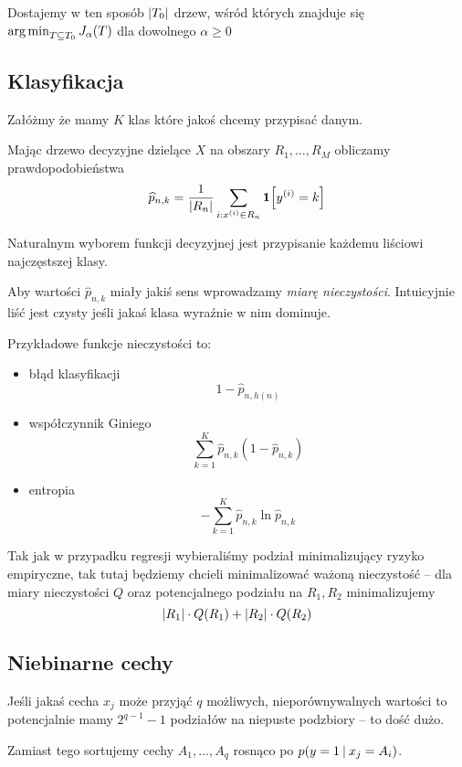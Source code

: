 Dostajemy w ten sposób \( \card{T_0} \) drzew, wśród których znajduje się \( \operatorname*{arg\,min}_{T \subseteq T_0}  J_\alpha(T) \) dla dowolnego \( \alpha \geq 0 \)


\subsection{Klasyfikacja}

Załóżmy że mamy \( K \) klas które jakoś chcemy przypisać danym.

Mając drzewo decyzyjne dzielące \( X \) na obszary \( R_1, \dots, R_M \)
obliczamy prawdopodobieństwa
\[
	\widehat p_{n, k} = \frac{1}{\card{R_n}} \sum_{i : x^{(i)} \in R_n} \indicator{y^{(i)} = k}
\]

Naturalnym wyborem funkcji decyzyjnej jest przypisanie każdemu liściowi najczęstszej klasy.

Aby wartości \( \widehat p_{n, k} \) miały jakiś sens wprowadzamy \textit{miarę nieczystości}.
Intuicyjnie liść jest czysty jeśli jakaś klasa wyraźnie w nim dominuje.

Przykładowe funkcje nieczystości to:
\begin{itemize}
	\item błąd klasyfikacji
	      \[
		      1 - \widehat p_{n, h(n)}
	      \]
	\item współczynnik Giniego
	      \[
		      \sum_{k=1}^K \widehat p_{n, k}(1 - \widehat p_{n, k})
	      \]
	\item entropia
	      \[
		      -\sum_{k=1}^K \widehat p_{n, k} \ln \widehat p_{n, k}
	      \]
\end{itemize}

Tak jak w przypadku regresji wybieraliśmy podział minimalizujący ryzyko empiryczne, tak tutaj będziemy chcieli minimalizować ważoną nieczystość -- dla miary nieczystości \( Q \) oraz potencjalnego podziału na \( R_1, R_2 \) minimalizujemy
\[
	\card{R_1} \cdot Q(R_1) + \card{R_2} \cdot Q(R_2)
\]

\subsection{Niebinarne cechy}

Jeśli jakaś cecha \( x_j \) może przyjąć \( q \) możliwych, nieporównywalnych wartości to potencjalnie mamy \( 2^{q - 1} - 1 \) podziałów na niepuste podzbiory -- to dość dużo.

Zamiast tego sortujemy cechy \( A_1, \dots, A_q \) rosnąco po \( p(y = 1 \:\vert\: x_j = A_i) \).

